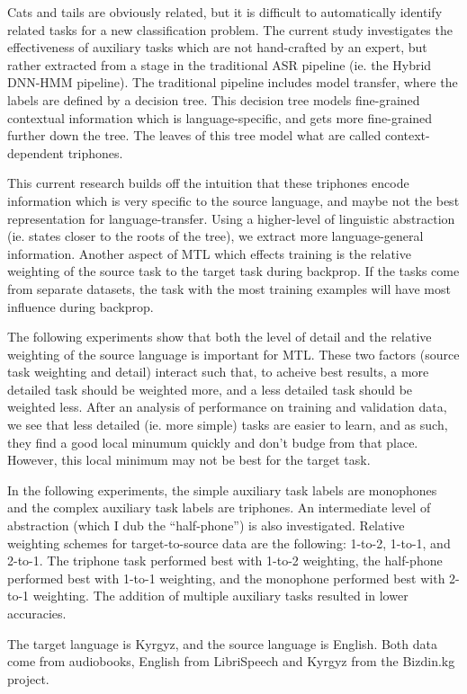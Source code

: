 \documentclass[a4paper]{article}
\begin{document}
Cats and tails are obviously related, but it is difficult to  automatically identify related tasks for a new classification problem. The current study investigates the effectiveness of auxiliary tasks which are not hand-crafted by an expert, but rather extracted from a stage in the traditional ASR pipeline (ie. the Hybrid DNN-HMM pipeline). The traditional pipeline includes model transfer, where the labels are defined by a decision tree. This decision tree models fine-grained contextual information which is language-specific, and gets more fine-grained further down the tree. The leaves of this tree model what are called context-dependent triphones.

This current research builds off the intuition that these triphones encode information which is very specific to the source language, and maybe not the best representation for language-transfer. Using a higher-level of linguistic abstraction (ie. states closer to the roots of the tree), we extract more language-general information. Another aspect of MTL which effects training is the relative weighting of the source task to the target task during backprop. If the tasks come from separate datasets, the task with the most training examples will have most influence during backprop. 

The following experiments show that both the level of detail and the relative weighting of the source language is important for MTL. These two factors (source task weighting and detail) interact such that, to acheive best results, a more detailed task should be weighted more, and a less detailed task should be weighted less. After an analysis of performance on training and validation data, we see that less detailed (ie. more simple) tasks are easier to learn, and as such, they find a good local minumum quickly and don't budge from that place. However, this local minimum may not be best for the target task.

In the following experiments, the simple auxiliary task labels are monophones and the complex auxiliary task labels are triphones. An intermediate level of abstraction (which I dub the ``half-phone'') is also investigated. Relative weighting schemes for target-to-source data are the following: 1-to-2, 1-to-1, and 2-to-1. The triphone task performed best with 1-to-2 weighting, the half-phone performed best with 1-to-1 weighting, and the monophone performed best with 2-to-1 weighting. The addition of multiple auxiliary tasks resulted in lower accuracies.

The target language is Kyrgyz, and the source language is English. Both data come from audiobooks, English from LibriSpeech \cite{panayotov2015} and Kyrgyz from the Bizdin.kg project.
\end{document}
